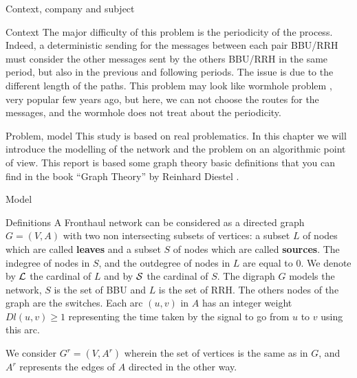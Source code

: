 \documentclass[a4paper,10pt]{report}
\begin{document}
\begin{chapter}{Context, company and subject}
\begin{section}{Context}
The major difficulty of this problem is the periodicity of the process. Indeed, a deterministic sending for the messages
between each pair BBU/RRH must consider the other messages sent by the others BBU/RRH in the same period, but also in the previous
and following periods. The issue is due to the different length of the paths. This problem may look like wormhole problem \cite{cole1996benefit}, very popular few years ago, but here, we can not choose the routes for the messages, and the wormhole does not treat about the periodicity.
\end{section}

\end{chapter}

\begin{chapter}{Problem, model}
This study is based on real problematics. In this chapter we will introduce the modelling 
of the network and the problem on an algorithmic point of view. This report is based some graph theory basic definitions that you can find in the book ``Graph Theory'' by Reinhard Diestel \cite{diestel2005graph}.
 \begin{section}{Model}
 \begin{subsection}{Definitions}
  A Fronthaul network can be considered as a directed graph $G=(V,A)$ with two non intersecting subsets of vertices: 
  a subset $L$ of nodes which are called {\bf leaves} and a subset $S$ of nodes which are called {\bf sources}.  
The indegree of nodes in $S$, and the outdegree of nodes in $L$ are equal to 0. 
We denote by ${\cal L}$ the cardinal of $L$ and by ${\cal S}$ the cardinal of $S$. The digraph $G$ models the network,
$S$ is the set of BBU and $L$ is the set of RRH. The others nodes of the graph are the switches.
Each arc  $(u,v)$ in $A$ has an integer weight $Dl(u,v) \geq 1$ representing the time taken by the signal to go from $u$ to $v$
 using this arc.

We consider $G^r=(V,A^r)$ wherein the set of vertices is the same as in $G$, and $A^r$ represents the edges of $A$ directed in the other way. 
\newline
\begin{center}
\end{center}
\end{subsection}
\end{section}
\end{chapter}
\end{document}
